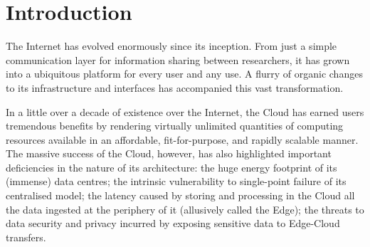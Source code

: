 \section{Introduction}
\label{sec:introduction}

The Internet has evolved enormously since its inception. From just a simple communication layer for information sharing between researchers, it has grown into a ubiquitous platform for every user and any use. 
A flurry of organic changes to its infrastructure and interfaces has accompanied this vast transformation.

In a little over a decade of existence over the Internet, the Cloud \cite{mell2011nist} has earned users tremendous benefits by rendering virtually unlimited quantities of computing resources available in an affordable, fit-for-purpose, and rapidly scalable manner.
The massive success of the Cloud, however, has also highlighted important deficiencies in the nature of its architecture: the huge energy footprint of its (immense) data centres; the intrinsic vulnerability to single-point failure of its centralised model; the latency caused by storing and processing in the Cloud all the data ingested at the periphery of it (allusively called the Edge); the threats to data security and privacy incurred by exposing sensitive data to Edge-Cloud transfers.

